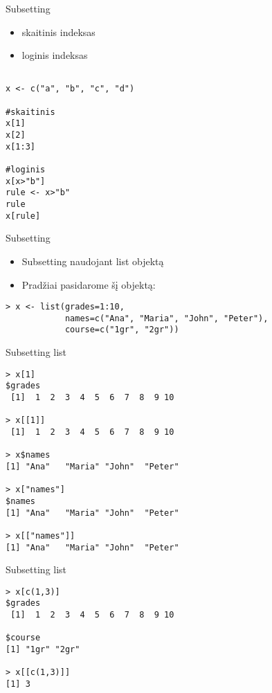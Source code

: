 \documentclass[11pt,xcolor=table]{beamer}
\begin{document}
\begin{frame}[fragile]{Subsetting}
\begin{itemize}
\item skaitinis indeksas
\item loginis indeksas
\end{itemize}
\begin{lstlisting}

x <- c("a", "b", "c", "d")

#skaitinis
x[1]
x[2]
x[1:3]

#loginis
x[x>"b"]
rule <- x>"b"
rule
x[rule]
\end{lstlisting}
\end{frame}

\begin{frame}[fragile]{Subsetting}
\begin{itemize}
\item Subsetting naudojant list objektą
\item Pradžiai pasidarome šį objektą:
\end{itemize}
\begin{lstlisting}
> x <- list(grades=1:10, 
			names=c("Ana", "Maria", "John", "Peter"),
			course=c("1gr", "2gr"))

\end{lstlisting}
\end{frame}

\begin{frame}[fragile]{Subsetting list}
\begin{lstlisting}
> x[1]
$grades
 [1]  1  2  3  4  5  6  7  8  9 10

> x[[1]]
 [1]  1  2  3  4  5  6  7  8  9 10

> x$names
[1] "Ana"   "Maria" "John"  "Peter"

> x["names"]
$names
[1] "Ana"   "Maria" "John"  "Peter"

> x[["names"]]
[1] "Ana"   "Maria" "John"  "Peter"
\end{lstlisting}
\end{frame}

\begin{frame}[fragile]{Subsetting list}
\begin{lstlisting}
> x[c(1,3)]
$grades
 [1]  1  2  3  4  5  6  7  8  9 10

$course
[1] "1gr" "2gr"

> x[[c(1,3)]]
[1] 3

\end{lstlisting}
\end{frame}
\end{document}
